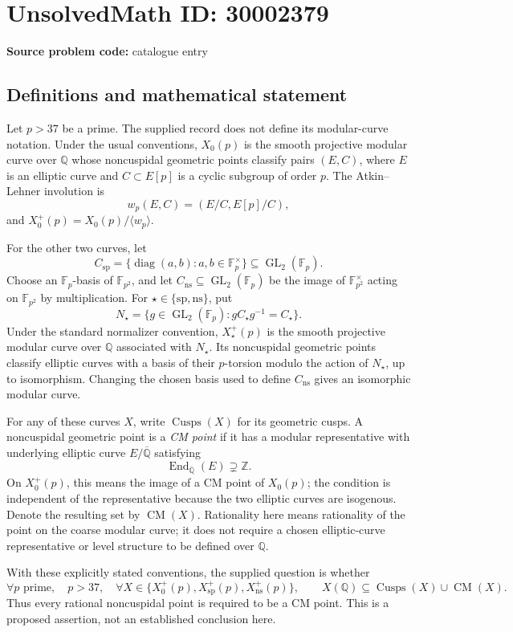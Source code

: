 \documentclass[11pt]{article}
\newcommand{\Z}{\mathbb{Z}}
\newcommand{\Q}{\mathbb{Q}}
\newcommand{\F}{\mathbb{F}}
\begin{document}
\section*{UnsolvedMath ID: 30002379}
\textbf{Source problem code:} catalogue entry
\subsection{Definitions and mathematical statement}
Let \(p>37\) be a prime. The supplied record does not define its modular-curve notation. Under the usual conventions, \(X_0(p)\) is the smooth projective modular curve over \(\Q\) whose noncuspidal geometric points classify pairs \((E,C)\), where \(E\) is an elliptic curve and \(C\subset E[p]\) is a cyclic subgroup of order \(p\). The Atkin--Lehner involution is
\[
w_p(E,C)=(E/C,E[p]/C),
\]
and \(X_0^+(p)=X_0(p)/\langle w_p\rangle\).

For the other two curves, let
\[
C_{\mathrm{sp}}=\{\operatorname{diag}(a,b):a,b\in\F_p^\times\}
\subseteq\operatorname{GL}_2(\F_p).
\]
Choose an \(\F_p\)-basis of \(\F_{p^2}\), and let \(C_{\mathrm{ns}}\subseteq\operatorname{GL}_2(\F_p)\) be the image of \(\F_{p^2}^{\times}\) acting on \(\F_{p^2}\) by multiplication. For \(\star\in\{\mathrm{sp},\mathrm{ns}\}\), put
\[
N_\star=\{g\in\operatorname{GL}_2(\F_p):gC_\star g^{-1}=C_\star\}.
\]
Under the standard normalizer convention, \(X_\star^+(p)\) is the smooth projective modular curve over \(\Q\) associated with \(N_\star\). Its noncuspidal geometric points classify elliptic curves with a basis of their \(p\)-torsion modulo the action of \(N_\star\), up to isomorphism. Changing the chosen basis used to define \(C_{\mathrm{ns}}\) gives an isomorphic modular curve.

For any of these curves \(X\), write \(\operatorname{Cusps}(X)\) for its geometric cusps. A noncuspidal geometric point is a \emph{CM point} if it has a modular representative with underlying elliptic curve \(E/\overline{\Q}\) satisfying
\[
\operatorname{End}_{\overline{\Q}}(E)\supsetneq\Z.
\]
On \(X_0^+(p)\), this means the image of a CM point of \(X_0(p)\); the condition is independent of the representative because the two elliptic curves are isogenous. Denote the resulting set by \(\operatorname{CM}(X)\). Rationality here means rationality of the point on the coarse modular curve; it does not require a chosen elliptic-curve representative or level structure to be defined over \(\Q\).

With these explicitly stated conventions, the supplied question is whether
\[
\forall p\text{ prime},\quad p>37,\quad
\forall X\in\{X_0^+(p),X_{\mathrm{sp}}^+(p),X_{\mathrm{ns}}^+(p)\},\qquad
X(\Q)\subseteq\operatorname{Cusps}(X)\cup\operatorname{CM}(X).
\]
Thus every rational noncuspidal point is required to be a CM point. This is a proposed assertion, not an established conclusion here.
\end{document}
